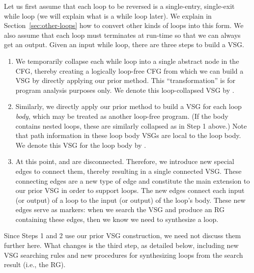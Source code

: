 \documentclass[12pt]{gatech-thesis}
\begin{document}
Let us first assume that each loop to be reversed is a single-entry, single-exit while loop (we will explain what is a while loop later).
We explain in Section~\ref{sec:other-loops} how to convert other kinds of loops into this form.
We also assume that each loop must terminates at run-time so that we can always get an output.
Given an input while loop, there are three steps to build a VSG.
%
\begin{enumerate}

\item We temporarily collapse each while loop into a single abstract node in the CFG, thereby creating a logically loop-free CFG from which we can build a VSG by directly applying our prior method.
This ``transformation'' is for program analysis purposes only. 
We denote this loop-collapsed VSG by \pVSG.

\item Similarly, we directly apply our prior method to build a VSG for each loop \emph{body}, which may be treated as another loop-free program.
(If the body contains nested loops, these are similarly collapsed as in Step 1 above.)
Note that path information in these loop body VSGs are local to the loop body.
We denote this VSG for the loop body by \lVSG.

\item At this point, \pVSG and \lVSG are disconnected.
Therefore, we introduce new special edges to connect them, thereby resulting in a single connected VSG.
These connecting edges are a new type of edge and constitute the main extension to our prior VSG in order to support loops.
The new edges connect each input (or output) of a loop to the input (or output) of the loop's body.
These new edges serve as markers: when we search the VSG and produce an RG containing these edges, then we know we need to synthesize a loop.

\end{enumerate}
%
Since Steps 1 and 2 use our prior VSG construction, we need not discuss them further here.
What changes is the third step, as detailed below, including new VSG searching rules and new procedures for synthesizing loops from the search result (i.e., the RG). %
\end{document}
